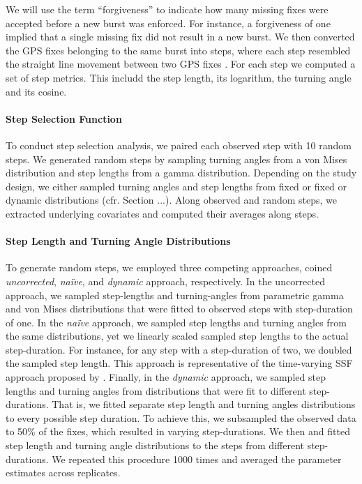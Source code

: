\documentclass[abstract=on,10pt,a4paper,bibliography=totocnumbered]{article}
\begin{document}
We will use the term  ``forgiveness'' to indicate how many missing fixes were
accepted before a new burst was enforced. For instance, a forgiveness of one
implied that a single missing fix did not result in a new burst. We then
converted the GPS fixes belonging to the same burst into steps, where each step
resembled the straight line movement between two GPS fixes \citep{Turchin.1998}.
For each step we computed a set of step metrics. This includd the step length,
its logarithm, the turning angle and its cosine.

\paragraph{Step Selection Function}
To conduct step selection analysis, we paired each observed step with 10 random
steps. We generated random steps by sampling turning angles from a von Mises
distribution and step lengths from a gamma distribution. Depending on the study
design, we either sampled turning angles and step lengths from fixed or fixed or
dynamic distributions (cfr. Section ...). Along observed and random steps, we
extracted underlying covariates and computed their averages along steps.

\paragraph{Step Length and Turning Angle Distributions}
To generate random steps, we employed three competing approaches, coined
\textit{uncorrected}, \textit{na\"ive}, and \textit{dynamic} approach,
respectively. In the uncorrected approach, we sampled step-lengths and
turning-angles from parametric gamma and von Mises distributions that were
fitted to observed steps with step-duration of one. In the \textit{na\"ive}
approach, we sampled step lengths and turning angles from the same
distributions, yet we linearly scaled sampled step lengths to the actual
step-duration. For instance, for any step with a step-duration of two, we
doubled the sampled step length. This approach is representative of the
time-varying SSF approach proposed by \cite{Munden.2021}. Finally, in the
\textit{dynamic} approach, we sampled step lengths and turning angles from
distributions that were fit to different step-durations. That is, we fitted
separate step length and turning angles distributions to every possible step
duration. To achieve this, we subsampled the observed data to 50\% of the fixes,
which resulted in varying step-durations. We then and fitted step length and
turning angle distributions to the steps from different step-durations. We
repeated this procedure 1000 times and averaged the parameter estimates across
replicates.
\end{document}
